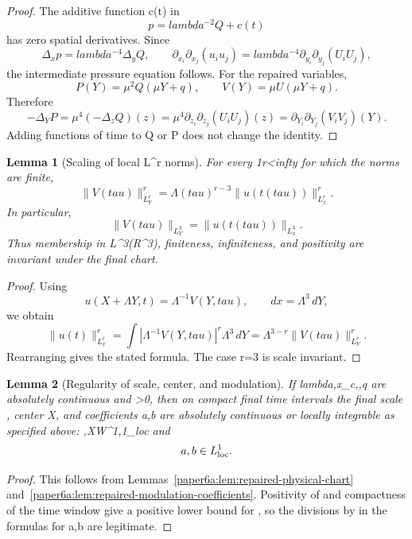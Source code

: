 \documentclass[11pt]{amsart}
\def\({}%
\def\){}%
\def\mathbb#1{#1}%
\def\tau{tau}%
\def\lambda{lambda}%
\def\infty{infty}%
\theoremstyle{plain}
\newtheorem{lemma}[lemma]{Lemma}
\theoremstyle{definition}
\theoremstyle{remark}
\begin{document}
\begin{proof}
The additive function \(c(t)\) in
\[
  p=\lambda^{-2}Q+c(t)
\]
has zero spatial derivatives.  Since
\[
  \Delta_xp=\lambda^{-4}\Delta_yQ,
  \qquad
  \partial_{x_i}\partial_{x_j}(u_iu_j)
  =
  \lambda^{-4}\partial_{y_i}\partial_{y_j}(U_iU_j),
\]
the intermediate pressure equation follows.  For the repaired variables,
\[
  P(Y)=\mu^2Q(\mu Y+q),
  \qquad
  V(Y)=\mu U(\mu Y+q).
\]
Therefore
\[
  -\Delta_YP
  =
  \mu^4(-\Delta_zQ)(z)
  =
  \mu^4\partial_{z_i}\partial_{z_j}(U_iU_j)(z)
  =
  \partial_{Y_i}\partial_{Y_j}(V_iV_j)(Y).
\]
Adding functions of time to \(Q\) or \(P\) does not change the identity.
\end{proof}

\begin{lemma}[Scaling of local \(L^r\) norms]
\label{paper6a:lem:critical-lp-scaling}
For every \(1\le r<\infty\) for which the norms are finite,
\[
  \|V(\tau)\|_{L^r_Y}^r
  =
  \Lambda(\tau)^{r-3}\|u(t(\tau))\|_{L^r_x}^r.
\]
In particular,
\[
  \|V(\tau)\|_{L^3_Y}=\|u(t(\tau))\|_{L^3_x}.
\]
Thus membership in \(L^3(\mathbb R^3)\), finiteness, infiniteness, and positivity
are invariant under the final chart.
\end{lemma}

\begin{proof}
Using
\[
  u(X+\Lambda Y,t)=\Lambda^{-1}V(Y,\tau),
  \qquad
  dx=\Lambda^3\,dY,
\]
we obtain
\[
  \|u(t)\|_{L^r_x}^r
  =
  \int |\Lambda^{-1}V(Y,\tau)|^r\Lambda^3\,dY
  =
  \Lambda^{3-r}\|V(\tau)\|_{L^r_Y}^r.
\]
Rearranging gives the stated formula.  The case \(r=3\) is scale invariant.
\end{proof}

\begin{lemma}[Regularity of scale, center, and modulation]
\label{paper6a:lem:ac-chart-regularity}
If \(\lambda,x_c,\mu,q\) are absolutely continuous and \(\mu>0\), then on
compact final time intervals the final scale \(\Lambda\), center \(X\), and
coefficients \(a,b\) are absolutely continuous or locally integrable as
specified above: \(\Lambda,X\in W^{1,1}_{\rm loc}\) and
\[
  a,b\in L^1_{\rm loc}.
\]
\end{lemma}

\begin{proof}
This follows from
Lemmas~\ref{paper6a:lem:repaired-physical-chart}
and~\ref{paper6a:lem:repaired-modulation-coefficients}.
Positivity of \(\mu\) and compactness of the time window give a positive lower
bound for \(\mu\), so the divisions by \(\mu\) in the formulas for \(a,b\) are
legitimate.
\end{proof}
\end{document}

